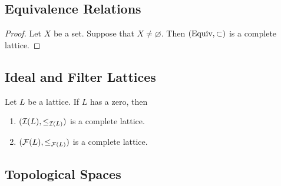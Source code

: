 \documentclass{book}
\begin{document}
	\subsection{Equivalence Relations}
	
	\begin{proof}
		Let $X$ be a set. Suppose that $X \neq \varnothing$. Then $(\operatorname*{\text{Equiv}}, \subset)$ is a complete lattice. 
	\end{proof}
	
	\subsection{Ideal and Filter Lattices}
	
	\begin{ex}
		Let $L$ be a lattice. If $L$ has a zero, then 
		\begin{enumerate}
			\item $(\mathcal{I}(L), \leq_{\mathcal{I}(L)})$ is a complete lattice.
			\item $(\mathcal{F}(L), \leq_{\mathcal{F}(L)})$ is a complete lattice.
		\end{enumerate}
	\end{ex}
	
	\subsection{Topological Spaces}
	
	
	
	
	
	
	
	
	
	
	
	
	
	
	
	
	
	
	
	
	
	
	
	
	
	
	
	
	
	
	
	
	
	
	
	
	
	
	
	
	
	
	
	
	
	
	
	
	
	
	
	
	
\end{document}
